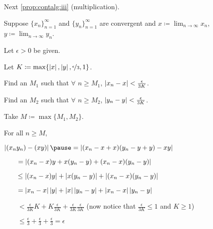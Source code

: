 \documentclass[10pt,aspectratio=169]{beamer}
\begin{document}
\begin{frame}

Next \eqref{prop:contalg:iii} (multiplication).

\pause
\medskip

Suppose $\{ x_n \}_{n=1}^\infty$ and $\{ y_n \}_{n=1}^\infty$ are convergent and
$\displaystyle x \coloneqq \lim_{n\to\infty} x_n$,
$\displaystyle y \coloneqq \lim_{n\to\infty} y_n$.

\pause
\medskip

Let $\epsilon > 0$ be given.

\pause
Let $K \coloneqq \max\{ \left\lvert {x} \right\rvert, \left\lvert {y} \right\rvert, \nicefrac{\epsilon}{3} , 1 \}$.

\pause
Find an $M_1$ such that $\forall$ $n \geq M_1$,
$\left\lvert {x_n - x} \right\rvert < \frac{\epsilon}{3K}$.

\pause
Find an $M_2$ such that $\forall$ $n \geq M_2$,
$\left\lvert {y_n - y} \right\rvert < \frac{\epsilon}{3K}$.

\pause
Take $M \coloneqq \max \{ M_1, M_2 \}$.

\pause
\medskip

For all $n \geq M$, 

\pause
\medskip

$\displaystyle
\abs{(x_ny_n) - (xy)}
\pause
=
\abs{(x_n-x+x)(y_n-y+y) - xy}
$

\pause
\medskip

$\displaystyle
\qquad
=
\left\lvert {(x_n-x)y + x(y_n-y) +(x_n-x)(y_n-y)} \right\rvert
$

\pause
\medskip

$\displaystyle
\qquad
\leq
\left\lvert {(x_n-x)y} \right\rvert + \left\lvert {x(y_n - y)} \right\rvert +
\left\lvert {(x_n-x)(y_n-y)} \right\rvert 
$

\pause
\medskip

$\displaystyle
\qquad
=
\left\lvert {x_n -x} \right\rvert\left\lvert {y} \right\rvert + 
\left\lvert {x} \right\rvert\left\lvert {y_n -y} \right\rvert + 
\left\lvert {x_n -x} \right\rvert\left\lvert {y_n -y} \right\rvert
$

\pause
\medskip

$\displaystyle
\qquad
<
\frac{\epsilon}{3K} K + 
K \frac{\epsilon}{3K} + 
\frac{\epsilon}{3K}
\frac{\epsilon}{3K}$
\qquad \qquad (now notice that $\tfrac{\epsilon}{3K} \leq 1$
and $K \geq 1$)

\pause
\medskip

$\displaystyle
\qquad
\leq
\frac{\epsilon}{3} + \frac{\epsilon}{3} + \frac{\epsilon}{3}
 = \epsilon$

\end{frame}
\end{document}
